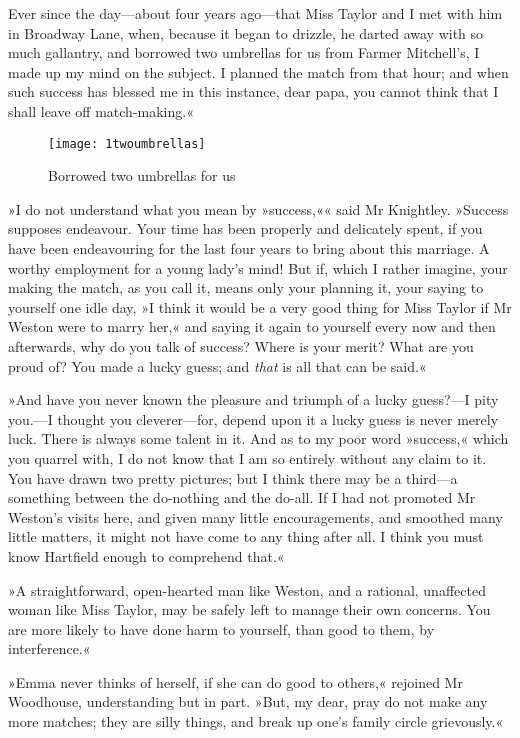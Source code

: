 Ever since the day—about four years ago—that Miss Taylor and I met with him in Broadway Lane, when, because it began to drizzle, he darted away with so much gallantry, and borrowed two umbrellas for us from Farmer Mitchell's, I made up my mind on the subject. I planned the match from that hour; and when such success has blessed me in this instance, dear papa, you cannot think that I shall leave off match-making.«

\begin{figure}[tbph]
\centering
\texttt{[image: 1twoumbrellas]}
\caption{Borrowed two umbrellas for us}
\end{figure}

»I do not understand what you mean by »success,«« said Mr Knightley. »Success supposes endeavour. Your time has been properly and delicately spent, if you have been endeavouring for the last four years to bring about this marriage. A worthy employment for a young lady's mind! But if, which I rather imagine, your making the match, as you call it, means only your planning it, your saying to yourself one idle day, »I think it would be a very good thing for Miss Taylor if Mr Weston were to marry her,« and saying it again to yourself every now and then afterwards, why do you talk of success? Where is your merit? What are you proud of? You made a lucky guess; and \textit{that} is all that can be said.«

»And have you never known the pleasure and triumph of a lucky guess?—I pity you.—I thought you cleverer—for, depend upon it a lucky guess is never merely luck. There is always some talent in it. And as to my poor word »success,« which you quarrel with, I do not know that I am so entirely without any claim to it. You have drawn two pretty pictures; but I think there may be a third—a something between the do-nothing and the do-all. If I had not promoted Mr Weston's visits here, and given many little encouragements, and smoothed many little matters, it might not have come to any thing after all. I think you must know Hartfield enough to comprehend that.«

»A straightforward, open-hearted man like Weston, and a rational, unaffected woman like Miss Taylor, may be safely left to manage their own concerns. You are more likely to have done harm to yourself, than good to them, by interference.«

»Emma never thinks of herself, if she can do good to others,« rejoined Mr Woodhouse, understanding but in part. »But, my dear, pray do not make any more matches; they are silly things, and break up one's family circle grievously.«

